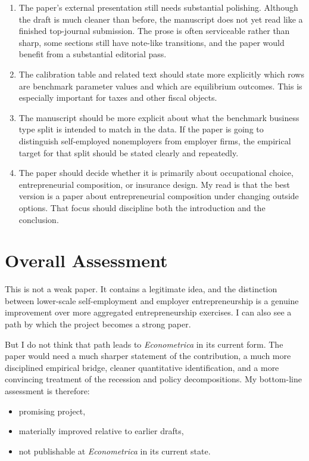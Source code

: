 \documentclass[11pt]{article}
\begin{document}
\begin{enumerate}[leftmargin=*,label=\textbf{\arabic*.}]
\item The paper's external presentation still needs substantial polishing.
Although the draft is much cleaner than before, the manuscript does not yet read
like a finished top-journal submission. The prose is often serviceable rather
than sharp, some sections still have note-like transitions, and the paper would
benefit from a substantial editorial pass.

\item The calibration table and related text should state more explicitly which
rows are benchmark parameter values and which are equilibrium outcomes. This is
especially important for taxes and other fiscal objects.

\item The manuscript should be more explicit about what the benchmark business
type split is intended to match in the data. If the paper is going to
distinguish self-employed nonemployers from employer firms, the empirical target
for that split should be stated clearly and repeatedly.

\item The paper should decide whether it is primarily about occupational choice,
entrepreneurial composition, or insurance design. My read is that the best
version is a paper about entrepreneurial composition under changing outside
options. That focus should discipline both the introduction and the conclusion.
\end{enumerate}

\section*{Overall Assessment}

This is not a weak paper. It contains a legitimate idea, and the distinction
between lower-scale self-employment and employer entrepreneurship is a genuine
improvement over more aggregated entrepreneurship exercises. I can also see a
path by which the project becomes a strong paper.

But I do not think that path leads to \textit{Econometrica} in its current form.
The paper would need a much sharper statement of the contribution, a much more
disciplined empirical bridge, cleaner quantitative identification, and a more
convincing treatment of the recession and policy decompositions. My bottom-line
assessment is therefore:

\begin{itemize}[leftmargin=*]
\item promising project,
\item materially improved relative to earlier drafts,
\item not publishable at \textit{Econometrica} in its current state.
\end{itemize}
\end{document}
